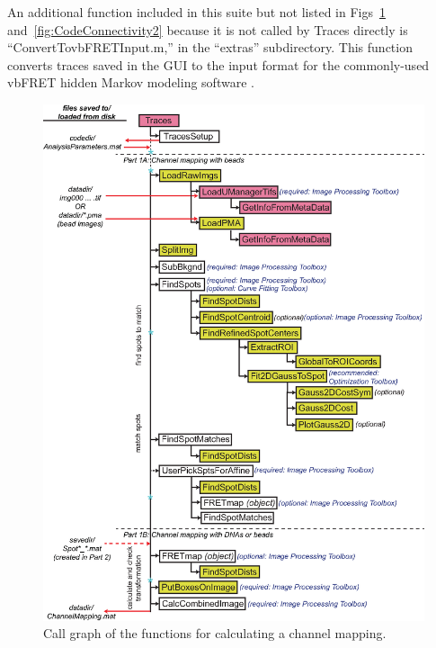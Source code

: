 \documentclass[11pt]{article}
\begin{document}
An additional function included in this suite but not listed in Figs~\ref{fig:CodeConnectivity1} and~\ref{fig:CodeConnectivity2} because it is not called by Traces directly is ``ConvertTovbFRETInput.m,'' in the ``extras'' subdirectory. This function converts traces saved in the GUI to the input format for the commonly-used vbFRET hidden Markov modeling software \cite{Bronson2009}.  

\begin{figure}[!p]
\begin{center}
\includegraphics[width=6in]{TracesFlowchart.eps}
\caption{Call graph of the functions for calculating a channel mapping.}
\label{fig:CodeConnectivity1}
\end{center}
\end{figure}
\end{document}

